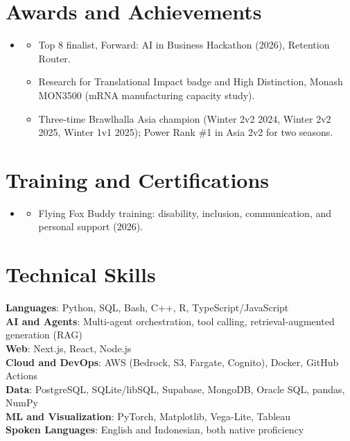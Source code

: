\documentclass[letterpaper,11pt]{article}
\newcommand{\resumeItem}[1]{\item\small{{#1 \vspace{-2pt}}}}
\newcommand{\resumeSubHeadingListStart}{\begin{itemize}[leftmargin=0.15in, label={}]}
\newcommand{\resumeSubHeadingListEnd}{\end{itemize}}
\newcommand{\resumeItemListStart}{\begin{itemize}}
\newcommand{\resumeItemListEnd}{\end{itemize}\vspace{-5pt}}
\begin{document}
\section{Awards and Achievements}
  \resumeSubHeadingListStart
    \item[]
    \resumeItemListStart
      \resumeItem{Top 8 finalist, Forward: AI in Business Hackathon (2026), Retention Router.}
      \resumeItem{Research for Translational Impact badge and High Distinction, Monash MON3500 (mRNA manufacturing capacity study).}
      \resumeItem{Three-time Brawlhalla Asia champion (Winter 2v2 2024, Winter 2v2 2025, Winter 1v1 2025); Power Rank \#1 in Asia 2v2 for two seasons.}
    \resumeItemListEnd
  \resumeSubHeadingListEnd

\section{Training and Certifications}
  \resumeSubHeadingListStart
    \item[]
    \resumeItemListStart
      \resumeItem{Flying Fox Buddy training: disability, inclusion, communication, and personal support (2026).}
    \resumeItemListEnd
  \resumeSubHeadingListEnd

\section{Technical Skills}
 \begin{itemize}[leftmargin=0.15in, label={}]
    \small{\item{
     \hspace{0.15in}\textbf{Languages}{: Python, SQL, Bash, C++, R, TypeScript/JavaScript} \\
     \hspace{0.15in}\textbf{AI and Agents}{: Multi-agent orchestration, tool calling, retrieval-augmented generation (RAG)} \\
     \hspace{0.15in}\textbf{Web}{: Next.js, React, Node.js} \\
     \hspace{0.15in}\textbf{Cloud and DevOps}{: AWS (Bedrock, S3, Fargate, Cognito), Docker, GitHub Actions} \\
     \hspace{0.15in}\textbf{Data}{: PostgreSQL, SQLite/libSQL, Supabase, MongoDB, Oracle SQL, pandas, NumPy} \\
     \hspace{0.15in}\textbf{ML and Visualization}{: PyTorch, Matplotlib, Vega-Lite, Tableau} \\
     \hspace{0.15in}\textbf{Spoken Languages}{: English and Indonesian, both native proficiency}
    }}
 \end{itemize}
\end{document}
